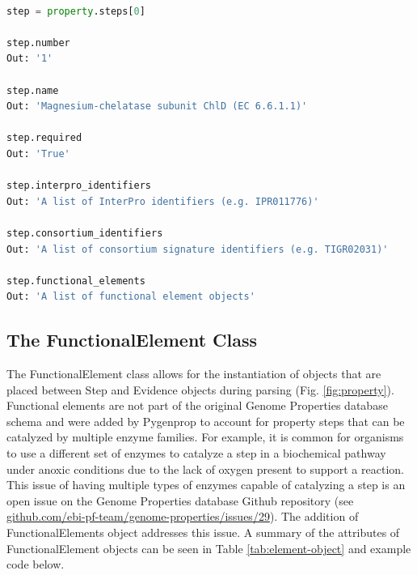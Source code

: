 \begin{lstlisting}[language=Python]

step = property.steps[0]
	
step.number
Out: '1'

step.name
Out: 'Magnesium-chelatase subunit ChlD (EC 6.6.1.1)'

step.required
Out: 'True'

step.interpro_identifiers
Out: 'A list of InterPro identifiers (e.g. IPR011776)'

step.consortium_identifiers 
Out: 'A list of consortium signature identifiers (e.g. TIGR02031)'

step.functional_elements
Out: 'A list of functional element objects'

\end{lstlisting}

\subsection{The FunctionalElement Class}

The FunctionalElement class allows for the instantiation of objects that are placed between Step and Evidence objects during parsing (Fig. \ref{fig:property}). Functional elements are not part of the original Genome Properties database schema and were added by Pygenprop to account for property steps that can be catalyzed by multiple enzyme families. For example, it is common for organisms to use a different set of enzymes to catalyze a step in a biochemical pathway under anoxic conditions due to the lack of oxygen present to support a reaction. This issue of having multiple types of enzymes capable of catalyzing a step is an open issue on the Genome Properties database Github repository (see \href{github.com/ebi-pf-team/genome-properties/issues/29}{github.com/ebi-pf-team/genome-properties/issues/29}). The addition of FunctionalElements object addresses this issue. A summary of the attributes of FunctionalElement objects can be seen in Table \ref{tab:element-object} and example code below.

